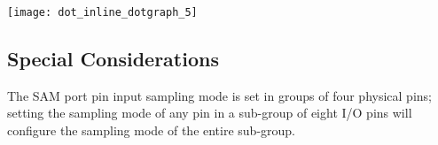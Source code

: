 \label{group__asfdoc__sam0__system__pinmux__group_asfdoc_sam0_system_pinmux_intconnections}%
\hypertarget{group__asfdoc__sam0__system__pinmux__group_asfdoc_sam0_system_pinmux_intconnections}{}%
\begin{center}

\begin{DoxyImageNoCaption}
  \mbox{\texttt{[image: dot\_inline\_dotgraph\_5]}}
\end{DoxyImageNoCaption}
\end{center}
\hypertarget{group__asfdoc__sam0__system__pinmux__group_asfdoc_sam0_system_pinmux_special_considerations}{}\subsection{Special Considerations}\label{group__asfdoc__sam0__system__pinmux__group_asfdoc_sam0_system_pinmux_special_considerations}
The S\+A\+M port pin input sampling mode is set in groups of four physical pins; setting the sampling mode of any pin in a sub-\/group of eight I/\+O pins will configure the sampling mode of the entire sub-\/group.

